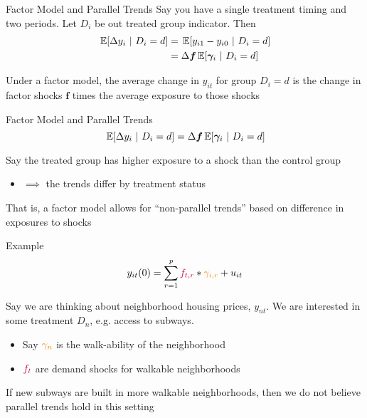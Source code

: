 \documentclass[aspectratio=169,t,11pt,table]{beamer}
\begin{document}
\begin{frame}{Factor Model and Parallel Trends}
  Say you have a single treatment timing and two periods. Let $D_i$ be out treated group indicator. Then
  \begin{align*}
    \expec{\Delta y_{i}}{D_i = d} 
    &= \expec{y_{i1} - y_{i0}}{D_i = d} \\ 
    &= \Delta \bm{f} \expec{\bm{\gamma}_i}{D_i = d} 
  \end{align*}
  
  \bigskip
  Under a factor model, the average change in $y_{it}$ for group $D_i = d$ is the change in factor shocks $\bm{f}$ times the average exposure to those shocks 
\end{frame}

\begin{frame}{Factor Model and Parallel Trends}
  \vspace*{-\bigskipamount}
  $$ 
    \expec{\Delta y_{i}}{D_i = d} = \Delta \bm{f} \expec{\bm{\gamma}_i}{D_i = d} 
  $$
  
  Say the treated group has higher exposure to a shock than the control group
  \begin{itemize}
    \item $\implies$ the trends differ by treatment status
  \end{itemize}

  \pause
  \bigskip
  That is, a factor model allows for ``non-parallel trends'' based on difference in exposures to shocks
\end{frame}

\begin{frame}{Example}
  \vspace*{-\bigskipamount}
  $$
    y_{it}(0) = \sum_{r = 1}^{p} {\color{purple}f_{t,r}} * {\color{orange}\gamma_{i,r}} + u_{it}
  $$

  \bigskip
  Say we are thinking about neighborhood housing prices, $y_{nt}$. We are interested in some treatment $D_n$, e.g. access to subways. 
  \begin{itemize}
    \item Say ${\color{orange}\gamma_n}$ is the walk-ability of the neighborhood
    \item ${\color{purple}f_{t}}$ are demand shocks for walkable neighborhoods
  \end{itemize}

  \bigskip
  If new subways are built in more walkable neighborhoods, then we do not believe parallel trends hold in this setting
\end{frame}
\end{document}

